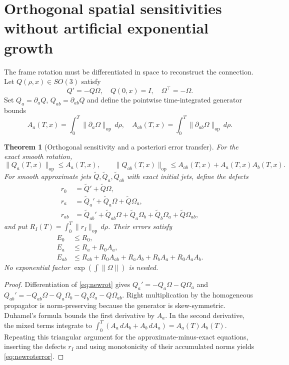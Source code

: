 \documentclass[11pt,a4paper]{article}
\newtheorem{theorem}{Theorem}[section]
\theoremstyle{remark}
\newcommand{\op}{\mathrm{op}}
\begin{document}
\section{Orthogonal spatial sensitivities without artificial exponential growth}
\label{sec:rotation}
The frame rotation must be differentiated in space to reconstruct the connection. Let $Q(\rho,x)\in SO(3)$ satisfy
\begin{equation}\label{eq:newrot}
Q'=-Q\Omega,\quad Q(0,x)=I,\quad \Omega^\top=-\Omega.
\end{equation}
Set $Q_a=\partial_aQ$, $Q_{ab}=\partial_{ab}Q$ and define the pointwise time-integrated generator bounds
\[
A_a(T,x)=\int_0^T\|\partial_a\Omega\|_{\op}\,d\rho,\quad
A_{ab}(T,x)=\int_0^T\|\partial_{ab}\Omega\|_{\op}\,d\rho.
\]
\begin{theorem}[Orthogonal sensitivity and a posteriori error transfer]\label{thm:newrotation}
For the exact smooth rotation,
\begin{equation}\label{eq:newrotbounds}
\|Q_a(T,x)\|_{\op}\le A_a(T,x),\qquad
\|Q_{ab}(T,x)\|_{\op}\le A_{ab}(T,x)+A_a(T,x)A_b(T,x).
\end{equation}
For smooth approximate jets $\widetilde Q,\widetilde Q_a,\widetilde Q_{ab}$ with exact initial jets, define the defects
\begin{align*}
r_0&=\widetilde Q'+\widetilde Q\Omega,\\
r_a&=\widetilde Q_a'+\widetilde Q_a\Omega+\widetilde Q\Omega_a,\\
r_{ab}&=\widetilde Q_{ab}'+\widetilde Q_{ab}\Omega+
\widetilde Q_a\Omega_b+\widetilde Q_b\Omega_a+\widetilde Q\Omega_{ab},
\end{align*}
and put $R_I(T)=\int_0^T\|r_I\|_{\op}\,d\rho$. Their errors satisfy
\begin{align}\label{eq:newroterror}
E_0&\le R_0,\nonumber\\
E_a&\le R_a+R_0A_a,\\
E_{ab}&\le R_{ab}+R_0A_{ab}+R_aA_b+R_bA_a+R_0A_aA_b.\nonumber
\end{align}
No exponential factor $\exp(\int\|\Omega\|)$ is needed.
\end{theorem}
\begin{proof}
Differentiation of \eqref{eq:newrot} gives $Q_a'=-Q_a\Omega-Q\Omega_a$ and
$Q_{ab}'=-Q_{ab}\Omega-Q_a\Omega_b-Q_b\Omega_a-Q\Omega_{ab}$. Right multiplication by the homogeneous propagator is norm-preserving because the generator is skew-symmetric. Duhamel's formula bounds the first derivative by $A_a$. In the second derivative, the mixed terms integrate to
$\int_0^T(A_a\,dA_b+A_b\,dA_a)=A_a(T)A_b(T)$. Repeating this triangular argument for the approximate-minus-exact equations, inserting the defects $r_I$ and using monotonicity of their accumulated norms yields \eqref{eq:newroterror}.
\end{proof}
\end{document}
